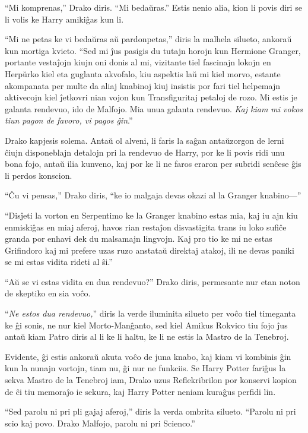 ``Mi komprenas,'' Drako diris. ``Mi bedaŭras.'' Estis nenio alia, kion
li povis diri se li volis ke Harry amikiĝas kun li.

``Mi ne petas ke vi bedaŭras aŭ pardonpetas,'' diris la malhela
silueto, ankoraŭ kun mortiga kvieto. ``Sed mi ĵus pasigis du tutajn
horojn kun Hermione Granger, portante vestaĵojn kiujn oni donis al mi,
vizitante tiel fascinajn lokojn en Herpŭrko kiel eta guglanta
akvofalo, kiu aspektis laŭ mi kiel morvo, estante akompanata per multe
da aliaj knabinoj kiuj insistis por fari tiel helpemajn aktivecojn
kiel ĵetkovri nian vojon kun Transfiguritaj petaloj de rozo. Mi estis
je galanta rendevuo, ido de Malfojo. Mia unua galanta
rendevuo. \emph{Kaj kiam mi vokos tiun pagon de favoro, vi pagos
ĝin}.''

Drako kapjesis solema. Antaŭ ol alveni, li faris la saĝan antaŭzorgon
de lerni ĉiujn disponeblajn detalojn pri la rendevuo de Harry, por ke
li povis ridi unu bona fojo, antaŭ ilia kunveno, kaj por ke li ne
faros eraron per subridi senĉese ĝis li perdos konscion.

``Ĉu vi pensas,'' Drako diris, ``ke io malgaja devas okazi al la
Granger knabino—''

``Disĵeti la vorton en Serpentimo ke la Granger knabino estas mia, kaj
iu ajn kiu enmiskiĝas en miaj aferoj, havos rian restaĵon disvastigita
trans iu loko sufiĉe granda por enhavi dek du malsamajn lingvojn. Kaj
pro tio ke mi ne estas Grifindoro kaj mi prefere uzas ruzo anstataŭ
direktaj atakoj, ili ne devas paniki se mi estas vidita rideti al
ŝi.''


``Aŭ se vi estas vidita en dua rendevuo?'' Drako diris, permesante nur
etan noton de skeptiko en sia voĉo.

``\emph{Ne estos dua rendevuo,}'' diris la verde iluminita silueto per
voĉo tiel timeganta ke ĝi sonis, ne nur kiel Morto-Manĝanto, sed kiel
Amikus Rokvico tiu fojo ĵus antaŭ kiam Patro diris al li ke li haltu,
ke li ne estis la Mastro de la Tenebroj.

Evidente, ĝi estis ankoraŭ akuta voĉo de juna knabo, kaj kiam vi
kombinis ĝin kun la nunajn vortojn, tiam nu, ĝi nur ne funkciis. Se
Harry Potter fariĝus la sekva Mastro de la Tenebroj iam, Drako uzus
Reflekribrilon por konservi kopion de ĉi tiu memoraĵo ie sekura, kaj
Harry Potter neniam kuraĝus perfidi lin.

``Sed parolu ni pri pli gajaj aferoj,'' diris la verda ombrita
silueto. ``Parolu ni pri scio kaj povo. Drako Malfojo, parolu ni pri
Scienco.''

